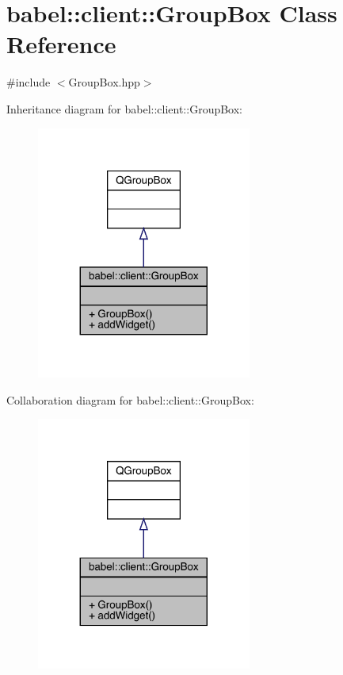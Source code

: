 \hypertarget{classbabel_1_1client_1_1_group_box}{}\section{babel\+:\+:client\+:\+:Group\+Box Class Reference}
\label{classbabel_1_1client_1_1_group_box}


{\ttfamily \#include $<$Group\+Box.\+hpp$>$}



Inheritance diagram for babel\+:\+:client\+:\+:Group\+Box\+:\nopagebreak
\begin{figure}[H]
\begin{center}
\leavevmode
\includegraphics[width=200pt]{classbabel_1_1client_1_1_group_box__inherit__graph}
\end{center}
\end{figure}


Collaboration diagram for babel\+:\+:client\+:\+:Group\+Box\+:\nopagebreak
\begin{figure}[H]
\begin{center}
\leavevmode
\includegraphics[width=200pt]{classbabel_1_1client_1_1_group_box__coll__graph}
\end{center}
\end{figure}

